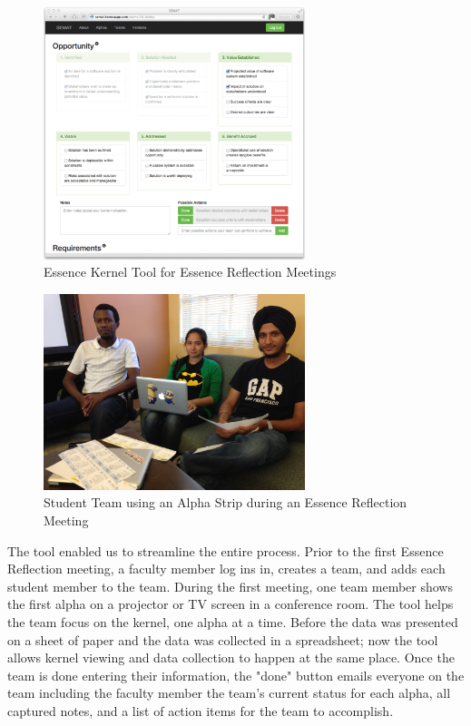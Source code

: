 \documentclass[preprint,12pt,3p]{elsarticle}
\begin{document}
\begin{figure}[ht]
\centering
\includegraphics[width=3.00in]{tool_photos/tool_photo}
\caption{Essence Kernel Tool for Essence Reflection Meetings}
\label{EssenceToolScreenshot}
\end{figure}

\begin{figure}[ht]
\centering
\includegraphics[width=3.00in]{student_photos/team_1}
\caption{Student Team using an Alpha Strip during an Essence Reflection Meeting}
\label{AlphaStrip}
\end{figure}

The tool enabled us to streamline the entire process. Prior to the first Essence Reflection meeting, a faculty member log ins in, creates a team, and adds each student member to the team. During the first meeting, one team member shows the first alpha on a projector or TV screen in a conference room. The tool helps the team focus on the kernel, one alpha at a time. Before the data was presented on a sheet of paper and the data was collected in a spreadsheet; now the tool allows kernel viewing and data collection to happen at the same place. Once the team is done entering their information, the "done" button emails everyone on the team including the faculty member the team's current status for each alpha, all captured notes, and a list of action items for the team to accomplish. 
\end{document}
